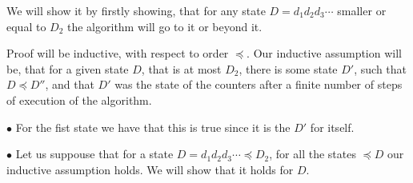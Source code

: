We will show it by firstly showing, that for any state $D = d_1d_2d_3\cdots$ smaller 
or equal to  
$D_2$ the algorithm will go to it or beyond it.

Proof will be inductive, with respect to order $\preceq$. Our inductive assumption will be, that 
for a given state $D$, that is at most $D_2$, 
there is some state $D'$, such 
that $D\preceq D''$, and that $D'$ was the state of the counters after a finite 
number of steps of execution of the algorithm. 

$\bullet$ For the fist state we have that this is true since it is the $D'$ for itself.

$\bullet$ Let us suppouse that for a state $D = d_1d_2d_3\cdots \preceq D_2$, for  
all the states $\preceq D$ our inductive assumption holds. We will show that it holds 
for $D$. 
 
